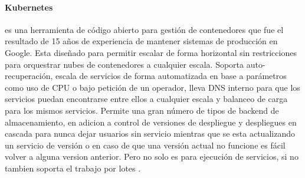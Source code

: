 \paragraph{Kubernetes}
es una herramienta de código abierto para gestión de contenedores que fue el resultado de 15 años de experiencia de mantener sistemas de producción en Google. Esta diseñado para permitir escalar de forma horizontal sin restricciones para orquestrar nubes de contenedores a cualquier escala. Soporta auto-recuperación, escala de servicios de forma automatizada en base a parámetros como uso de CPU o bajo petición de un operador, lleva DNS interno para que los servicios puedan encontrarse entre ellos a cualquier escala y balanceo de carga para los mismos servicios. Permite una gran número de tipos de backend de almacenamiento, en adicion a control de versiones de despliegue y despliegues en cascada para nunca dejar usuarios sin servicio mientras que se esta actualizando un servicio de versión o en caso de que una versión actual no funcione es fácil volver a alguna version anterior. Pero no solo es para ejecución de servicios, si no tambien soporta el trabajo por lotes \citep{kubernetes}.
 

